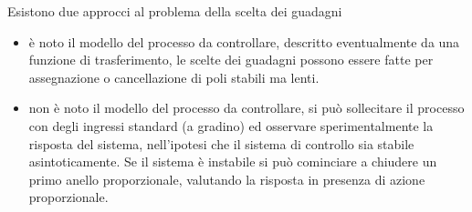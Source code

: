 \documentclass[10pt, letterpaper]{report}
\begin{document}
Esistono due approcci al problema della scelta dei guadagni\begin{itemize}
    \item è noto il modello del processo da controllare, descritto eventualmente da una funzione di trasferimento, le scelte dei guadagni possono essere fatte per assegnazione o cancellazione di poli stabili ma lenti.
    \item non è noto il modello del processo da controllare, si può sollecitare il processo con degli ingressi standard (a gradino) ed osservare sperimentalmente la risposta del sistema, nell'ipotesi che il sistema di controllo sia stabile asintoticamente. Se il sistema è instabile si può cominciare a chiudere un primo anello proporzionale, valutando la risposta in presenza di azione proporzionale. 
\end{itemize}
\end{document}
